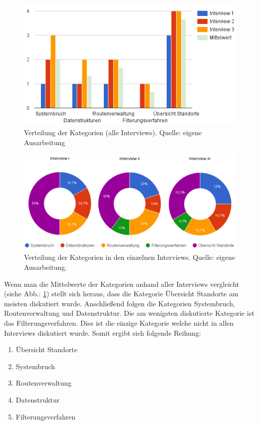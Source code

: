 \documentclass[Bachelorarbeit.tex]{subfiles}
\begin{document}
\begin{figure}[H]
	\centering
	\includegraphics[width=0.9\linewidth]{img/Interviews/KategorienGesamt}
	\caption[Verteilung der Kategorien (alle Interviews)]{Verteilung der Kategorien (alle Interviews). Quelle: eigene Ausarbeitung}
	\label{fig:KategorienGesamt}
\end{figure}

\begin{figure}[H]
	\centering
	\includegraphics[width=0.9\linewidth]{img/Interviews/VerteilungNachInterview}
	\caption[Verteilung der Kategorien in den einzelnen Interviews]{Verteilung der Kategorien in den einzelnen Interviews. Quelle: eigene Ausarbeitung.}
	\label{fig:VerteilungNachInterview}
\end{figure}

Wenn man die Mittelwerte der Kategorien anhand aller Interviews vergleicht (siehe Abb.: \ref{fig:KategorienGesamt}) stellt sich heraus, dass die Kategorie Übersicht Standorte am meisten diskutiert wurde. 
Anschließend folgen die Kategorien Systembruch, Routenverwaltung und Datenstruktur.
Die am wenigsten diskutierte Kategorie ist das Filterungsverfahren. 
Dies ist die einzige Kategorie welche nicht in allen Interviews diskutiert wurde.
Somit ergibt sich folgende Reihung:

\begin{enumerate}
	\item Übersicht Standorte
	\item Systembruch
	\item Routenverwaltung
	\item Datenstruktur
	\item Filterungsverfahren
\end{enumerate}
\end{document}

